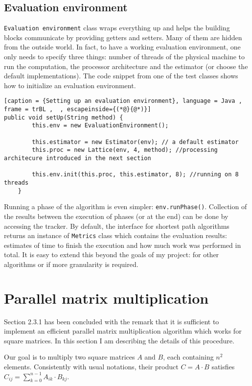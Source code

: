 \documentclass[12pt,a4paper,twoside,openright]{report}
\begin{document}
\subsection{Evaluation environment}
\texttt{Evaluation environment} class wraps everything up and helps the building blocks communicate by providing getters and setters. Many of them are hidden from the outside world. In fact, to have a working evaluation environment, one only needs to specify three things: number of threads of the physical machine to run the computation, the processor architecture and the estimator (or choose the default implementations). The code snippet from one of the test classes shows how to initialize an evaluation environment. 

\begin{lstlisting}[caption = {Setting up an evaluation environment}, language = Java , frame = trBL ,  , escapeinside={(*@}{@*)}]
public void setUp(String method) {
        this.env = new EvaluationEnvironment();

        this.estimator = new Estimator(env); // a default estimator
        this.proc = new Lattice(env, 4, method); //processing architecure introduced in the next section

        this.env.init(this.proc, this.estimator, 8); //running on 8 threads
    }

\end{lstlisting}

Running a phase of the algorithm is even simpler: \texttt{env.runPhase()}. Collection of the results between the execution of phases (or at the end) can be done by accessing the tracker. By default, the interface for shortest path algorithms returns an instance of \texttt{Metrics} class which contains the evaluation results: estimates of time to finish the execution and how much work was performed in total. It is easy to extend this beyond the goals of my project: for other algorithms or if more granularity is required. 

\section{Parallel matrix multiplication}
Section 2.3.1 has been concluded with the remark that it is sufficient to implement an efficient parallel matrix multiplication algorithm which works for square matrices. In this section I am describing the details of this procedure.

Our goal is to multiply two square matrices $A$ and $B$, each containing $n^2$ elements. Consistently with usual notations, their product $C=A\cdot B$ satisfies $C_{ij} = \sum_{k=0}^{n-1} A_{ik}\cdot B_{kj}$. 
\end{document}
